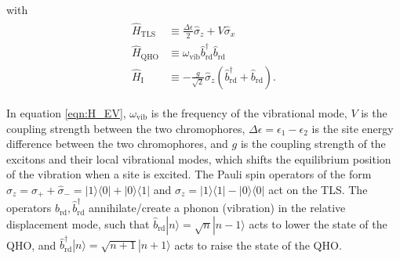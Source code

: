 \documentclass[12pt]{article}
\begin{document}
with 
\begin{align*}
    \begin{aligned}
        \hat{H}_{\scriptscriptstyle \text{TLS}} &\equiv \frac{\Delta\epsilon}{2}\hat{\sigma}_z + V\hat{\sigma}_x \\
        \hat{H}_{\scriptscriptstyle \text{QHO}} &\equiv \omega_{\scriptscriptstyle \text{vib}} \hat{b}_{\scriptscriptstyle \text{rd}}^\dagger \hat{b}_{\scriptscriptstyle \text{rd}} \\
        \hat{H}_{\scriptscriptstyle \text{I}} &\equiv-\frac{g}{\sqrt{2}}\hat{\sigma}_z\left(\hat{b}_{\scriptscriptstyle \text{rd}}^\dagger + \hat{b}_{\scriptscriptstyle \text{rd}}\right).
    \end{aligned}
\end{align*}

In equation \eqref{eqn:H_EV}, $ \omega_{\scriptscriptstyle \text{vib}}$ is the frequency of the vibrational mode, $V$ is the coupling strength between the two chromophores, $\Delta\epsilon = \epsilon_1 - \epsilon_2$ is the site energy difference between the two chromophores, and $g$ is the coupling strength of the excitons and their local vibrational modes, which shifts the equilibrium position of the vibration when a site is excited. The Pauli spin operators of the form $\hat{\sigma}_z = \hat{\sigma}_+ + \hat{\sigma}_- = |1\rangle\langle 0| + |0\rangle\langle 1|$ and $\hat{\sigma}_z = |1\rangle\langle1| - |0\rangle\langle0|$ act on the TLS. The operators $\hat{b}_{\scriptscriptstyle \text{rd}}, \hat{b}_{\scriptscriptstyle \text{rd}}^\dagger$ annihilate/create a phonon (vibration) in the relative displacement mode, such that $\hat{b}_{\scriptscriptstyle \text{rd}}|n\rangle = \sqrt{n}|n-1\rangle$ acts to lower the state of the QHO, and $\hat{b}_{\scriptscriptstyle \text{rd}}^{\dagger}|n\rangle = \sqrt{n+1}|n+1\rangle$ acts to raise the state of the QHO.
\end{document}
